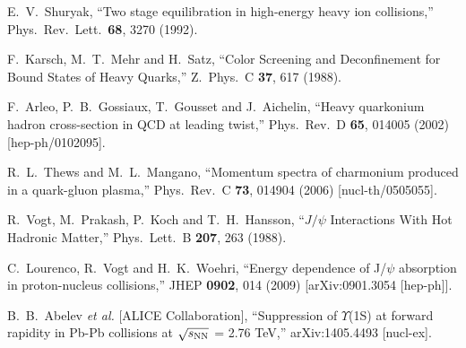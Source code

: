 \documentclass[aps,prc,preprint,superscriptaddress,showpacs,showkeys]{revtex4-1}
\begin{document}
\begin{thebibliography}{100}
  E.~V.~Shuryak,
  ``Two stage equilibration in high-energy heavy ion collisions,''
  Phys.\ Rev.\ Lett.\  {\bf 68}, 3270 (1992).
  
  F.~Karsch, M.~T.~Mehr and H.~Satz,
  ``Color Screening and Deconfinement for Bound States of Heavy Quarks,''
  Z.\ Phys.\ C {\bf 37}, 617 (1988).
  
  F.~Arleo, P.~B.~Gossiaux, T.~Gousset and J.~Aichelin,
  ``Heavy quarkonium hadron cross-section in QCD at leading twist,''
  Phys.\ Rev.\ D {\bf 65}, 014005 (2002)
  [hep-ph/0102095].
  
  R.~L.~Thews and M.~L.~Mangano,
  ``Momentum spectra of charmonium produced in a quark-gluon plasma,''
  Phys.\ Rev.\ C {\bf 73}, 014904 (2006)
  [nucl-th/0505055].
  
  R.~Vogt, M.~Prakash, P.~Koch and T.~H.~Hansson,
  ``$J/\psi$ Interactions With Hot Hadronic Matter,''
  Phys.\ Lett.\ B {\bf 207}, 263 (1988).
  
  C.~Lourenco, R.~Vogt and H.~K.~Woehri,
  ``Energy dependence of J/$\psi$ absorption in proton-nucleus collisions,''
  JHEP {\bf 0902}, 014 (2009)
  [arXiv:0901.3054 [hep-ph]].
  
   B.~B.~Abelev {\it et al.}  [ALICE Collaboration],
   ``Suppression of $\Upsilon$(1S) at forward rapidity in Pb-Pb collisions at $\sqrt{s_{\rm NN}}$ = 2.76 TeV,''
   arXiv:1405.4493 [nucl-ex].
   
   

\end{thebibliography}
\end{document}
